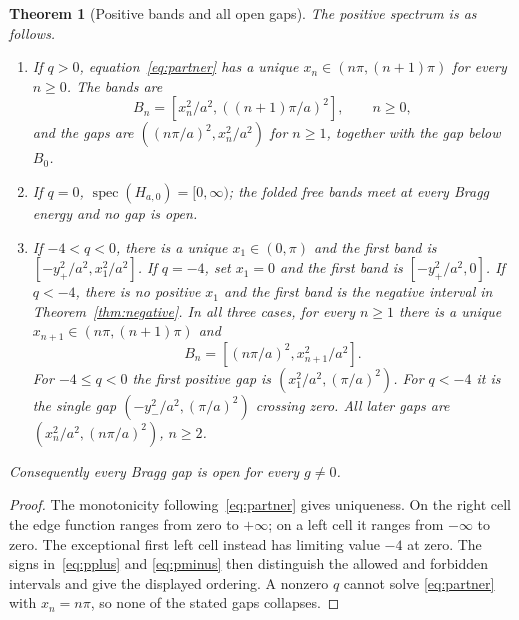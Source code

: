 \documentclass[10pt]{article}
\newtheorem{theorem}{Theorem}
\newcommand{\spec}{\operatorname{spec}}
\begin{document}
\begin{theorem}[Positive bands and all open gaps]\label{thm:positive}
The positive spectrum is as follows.
\begin{enumerate}
\item If $q>0$, equation~\eqref{eq:partner} has a unique
$x_n\in(n\pi,(n+1)\pi)$ for every $n\geq0$.  The bands are
\[
 B_n=[x_n^2/a^2,((n+1)\pi/a)^2],\qquad n\geq0,
\]
and the gaps are $((n\pi/a)^2,x_n^2/a^2)$ for $n\geq1$, together with the
gap below $B_0$.
\item If $q=0$, $\spec(H_{a,0})=[0,\infty)$; the folded free bands meet at
every Bragg energy and no gap is open.
\item If $-4<q<0$, there is a unique $x_1\in(0,\pi)$ and the first band is
$[-y_+^2/a^2,x_1^2/a^2]$.  If $q=-4$, set $x_1=0$ and the first band is
$[-y_+^2/a^2,0]$.  If $q<-4$, there is no positive $x_1$ and the first band
is the negative interval in Theorem~\ref{thm:negative}.  In all three cases,
for every $n\geq1$ there is a unique
$x_{n+1}\in(n\pi,(n+1)\pi)$ and
\[
 B_n=[(n\pi/a)^2,x_{n+1}^2/a^2].
\]
For $-4\leq q<0$ the first positive gap is $(x_1^2/a^2,(\pi/a)^2)$.
For $q<-4$ it is the single gap $(-y_-^2/a^2,(\pi/a)^2)$ crossing zero.
All later gaps are $(x_n^2/a^2,(n\pi/a)^2)$, $n\geq2$.
\end{enumerate}
Consequently every Bragg gap is open for every $g\ne0$.
\end{theorem}
\begin{proof}
The monotonicity following~\eqref{eq:partner} gives uniqueness.  On the
right cell the edge function ranges from zero to $+\infty$; on a left cell
it ranges from $-\infty$ to zero.  The exceptional first left cell instead
has limiting value $-4$ at zero.  The signs in~\eqref{eq:pplus} and
\eqref{eq:pminus} then distinguish the allowed and forbidden intervals and
give the displayed ordering.  A nonzero $q$ cannot solve
\eqref{eq:partner} with $x_n=n\pi$, so none of the stated gaps collapses.
\end{proof}
\end{document}
